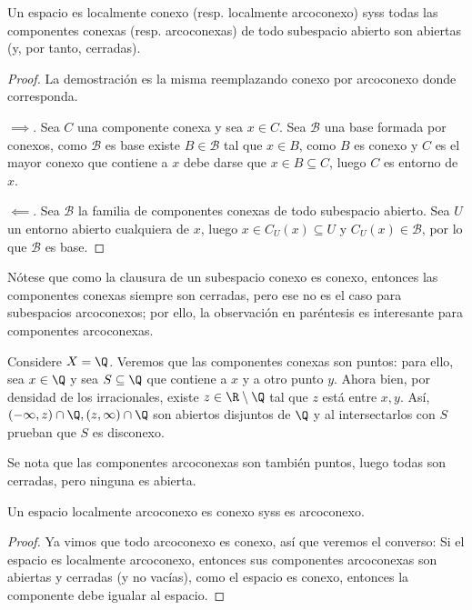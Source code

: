 \documentclass[topologia-analisis.tex]{subfiles}
\begin{document}
\begin{thm}
	Un espacio es localmente conexo (resp. localmente arcoconexo) syss todas las componentes conexas (resp. arcoconexas)
	de todo subespacio abierto son abiertas (y, por tanto, cerradas).
\end{thm}
\begin{proof}
	La demostración es la misma reemplazando conexo por arcoconexo donde corresponda.

	$\implies$. Sea $C$ una componente conexa y sea $x\in C$.
	Sea $\mathcal{B}$ una base formada por conexos, como $\mathcal{B}$ es base existe $B \in \mathcal{B}$ tal que $x\in B$, como $B$ es conexo
	y $C$ es el mayor conexo que contiene a $x$ debe darse que $x \in B \subseteq C$, luego $C$ es entorno de $x$.

	$\impliedby$.
	Sea $\mathcal{B}$ la familia de componentes conexas de todo subespacio abierto.
	Sea $U$ un entorno abierto cualquiera de $x$, luego $x \in C_U(x) \subseteq U$ y $C_U(x) \in \mathcal{B}$, por lo que $\mathcal{B}$ es base.
\end{proof}
Nótese que como la clausura de un subespacio conexo es conexo, entonces las componentes conexas siempre son cerradas, pero ese no es el caso para
subespacios arcoconexos; por ello, la observación en paréntesis es interesante para componentes arcoconexas.
\begin{ex}
	Considere $X = \Q$.
	Veremos que las componentes conexas son puntos: para ello, sea $x \in \Q$ y sea $S \subseteq \Q$ que contiene a $x$ y a otro punto $y$.
	Ahora bien, por densidad de los irracionales, existe $z \in \R \setminus \Q$ tal que $z$ está entre $x, y$.
	Así, $(-\infty, z) \cap \Q, (z, \infty) \cap \Q$ son abiertos disjuntos de $\Q$ y al intersectarlos con $S$ prueban que $S$ es disconexo.

	Se nota que las componentes arcoconexas son también puntos, luego todas son cerradas, pero ninguna es abierta.
\end{ex}

\begin{thm}
	Un espacio localmente arcoconexo es conexo syss es arcoconexo.
\end{thm}
\begin{proof}
	Ya vimos que todo arcoconexo es conexo, así que veremos el converso:
	Si el espacio es localmente arcoconexo, entonces sus componentes arcoconexas son abiertas y cerradas (y no vacías), como el espacio es conexo,
	entonces la componente debe igualar al espacio.
\end{proof}
\end{document}
